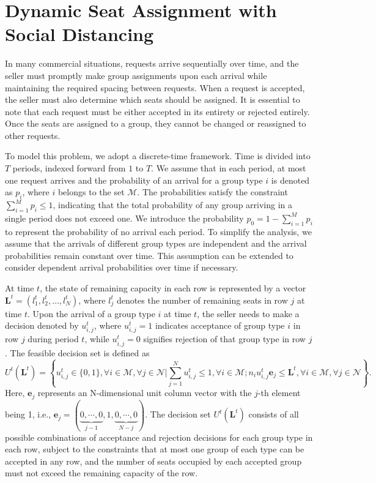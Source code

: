 \section{Dynamic Seat Assignment with Social Distancing}\label{sec_dynamic_seat}
In many commercial situations, requests arrive sequentially over time, and the seller must promptly make group assignments upon each arrival while maintaining the required spacing between requests. When a request is accepted, the seller must also determine which seats should be assigned. It is essential to note that each request must be either accepted in its entirety or rejected entirely. Once the seats are assigned to a group, they cannot be changed or reassigned to other requests.

To model this problem, we adopt a discrete-time framework. Time is divided into $T$ periods, indexed forward from $1$ to $T$. We assume that in each period, at most one request arrives and the probability of an arrival for a group type $i$ is denoted as $p_i$, where $i$ belongs to the set $\mathcal{M}$. The probabilities satisfy the constraint $\sum_{i=1}^M p_i \leq 1$, indicating that the total probability of any group arriving in a single period does not exceed one. We introduce the probability $p_0 = 1 - \sum_{i=1}^{M} p_i$ to represent the probability of no arrival each period. To simplify the analysis, we assume that the arrivals of different group types are independent and the arrival probabilities remain constant over time. This assumption can be extended to consider dependent arrival probabilities over time if necessary.

At time $t$, the state of remaining capacity in each row is represented by a vector $\mathbf{L}^{t} = (l_1^{t}, l_2^{t}, \ldots, l_N^{t})$, where $l_j^{t}$ denotes the number of remaining seats in row $j$ at time $t$. Upon the arrival of a group type $i$ at time $t$, the seller needs to make a decision denoted by $u_{i,j}^{t}$, where $u_{i,j}^{t} = 1$ indicates acceptance of group type $i$ in row $j$ during period $t$, while $u_{i,j}^{t} = 0$ signifies rejection of that group type in row $j$. The feasible decision set is defined as $$U^{t}(\mathbf{L}^{t}) = \left\{u_{i,j}^{t} \in \{0,1\}, \forall i \in \mathcal{M}, \forall j \in \mathcal{N} \big| \sum_{j=1}^{N} u_{i,j}^{t} \leq 1, \forall i \in \mathcal{M}; n_{i}u_{i,j}^{t}\mathbf{e}_j \leq \mathbf{L}^{t}, \forall i \in \mathcal{M}, \forall j \in \mathcal{N}\right\}.$$
Here, $\mathbf{e}_j$ represents an N-dimensional unit column vector with the $j$-th element being 1, i.e., $\mathbf{e}_j = (\underbrace{0, \cdots, 0}_{j-1}, 1, \underbrace{0, \cdots, 0}_{N-j})$. The decision set $U^{t}(\mathbf{L}^{t})$ consists of all possible combinations of acceptance and rejection decisions for each group type in each row, subject to the constraints that at most one group of each type can be accepted in any row, and the number of seats occupied by each accepted group must not exceed the remaining capacity of the row.


